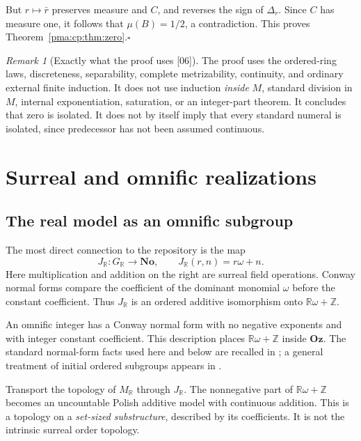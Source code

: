 \documentclass[11pt]{article}
\numberwithin{equation}{section}
\theoremstyle{definition}
\theoremstyle{remark}
\newtheorem{remark}[remark]{Remark}
\newcommand{\Z}{\mathbb Z}
\newcommand{\R}{\mathbb R}
\newcommand{\No}{\mathbf{No}}
\newcommand{\Oz}{\mathbf{Oz}}
\newcommand{\src}[1]{\textup{\textsf{\small[#1]}}}
\begin{document}
But $r\mapsto\bar r$ preserves measure and $C$, and reverses the sign
of $\Delta_r$. Since $C$ has measure one, it follows that
$\mu(B)=1/2$, a contradiction. This proves
Theorem~\ref{pma:cp:thm:zero}.\hfill$\square$

\begin{remark}[Exactly what the proof uses \src{06}]
The proof uses the ordered-ring laws, discreteness, separability,
complete metrizability, continuity, and ordinary external finite
induction. It does not use induction \emph{inside} $M$, standard
division in $M$, internal exponentiation, saturation, or an
integer-part theorem. It concludes that zero is isolated. It does
not by itself imply that every standard numeral is isolated, since
predecessor has not been assumed continuous.
\end{remark}

\section{Surreal and omnific realizations}
\label{pma:cp:sec:surreal}

\subsection{The real model as an omnific subgroup}

The most direct connection to the repository is the map
\begin{equation}
\label{pma:cp:eq:realomnific}
J_{\R}:G_{\R}\longrightarrow\No,
\qquad J_{\R}(r,n)=r\omega+n.
\end{equation}
Here multiplication and addition on the right are surreal field operations.
Conway normal forms compare the coefficient of the dominant monomial
$\omega$ before the constant coefficient. Thus $J_{\R}$ is an
ordered additive isomorphism onto $\R\omega+\Z$.

An omnific integer has a Conway normal form with no negative exponents
and with integer constant coefficient. This description places
$\R\omega+\Z$ inside $\Oz$. The standard normal-form facts used here
and below are recalled in \cite{BerarducciMantova}; a general treatment
of initial ordered subgroups appears in \cite{EhrlichKaplan}.

Transport the topology of $M_{\R}$ through $J_{\R}$. The nonnegative
part of $\R\omega+\Z$ becomes an uncountable Polish additive model
with continuous addition. This is a topology on a \emph{set-sized
substructure}, described by its coefficients. It is not the intrinsic
surreal order topology.
\end{document}
